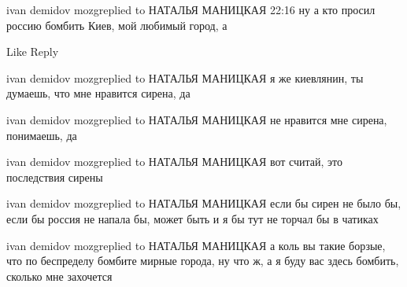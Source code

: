  
 
 
 
 

ivan demidov mozgreplied to НАТАЛЬЯ МАНИЦКАЯ
22:16
ну а кто просил россию бомбить Киев, мой любимый город, а

    Like
    Reply

ivan demidov mozgreplied to НАТАЛЬЯ МАНИЦКАЯ
я же киевлянин, ты думаешь, что мне нравится сирена, да

ivan demidov mozgreplied to НАТАЛЬЯ МАНИЦКАЯ
не нравится мне сирена, понимаешь, да

ivan demidov mozgreplied to НАТАЛЬЯ МАНИЦКАЯ
вот считай, это последствия сирены

ivan demidov mozgreplied to НАТАЛЬЯ МАНИЦКАЯ
если бы сирен не было бы, если бы россия не напала бы, может быть и я бы тут не торчал бы в чатиках

ivan demidov mozgreplied to НАТАЛЬЯ МАНИЦКАЯ
а коль вы такие борзые, что по беспределу бомбите мирные города, ну что ж, а я буду вас здесь бомбить, сколько мне захочется












